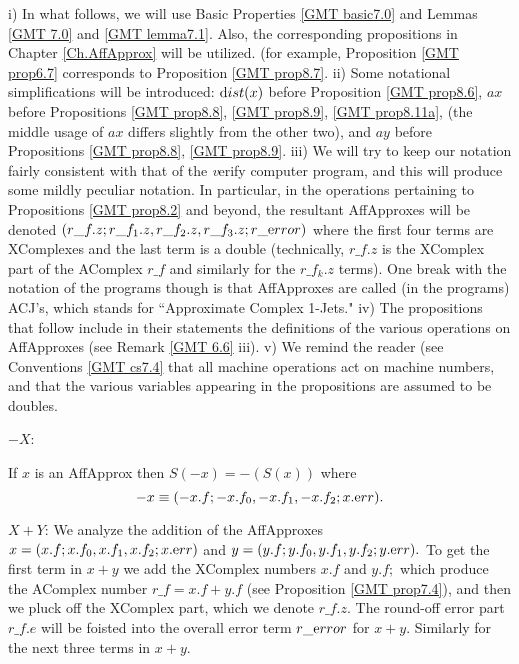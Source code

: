 \begin{conventions}\label{GMT 8.3}
i)  In what follows, we will use Basic Properties \ref{GMT basic7.0} and Lemmas \ref{GMT 7.0} and \ref{GMT lemma7.1}.  Also, the corresponding propositions in
	Chapter \ref{Ch.AffApprox}
will be utilized.
(for example, Proposition \ref{GMT prop6.7} corresponds to Proposition \ref{GMT prop8.7}.  
	ii)  Some notational simplifications will be introduced: ${\textrm dist}(x)$ before Proposition \ref{GMT prop8.6}, $ax$ before Propositions \ref{GMT prop8.8}, \ref{GMT prop8.9}, \ref{GMT prop8.11a}, 
	(the middle usage of $ax$ differs slightly from the other two), and $ay$ before Propositions \ref{GMT prop8.8}, \ref{GMT prop8.9}.
	iii)  We will try to keep our notation fairly consistent with that of the {\textit verify} computer program, and this will produce some mildly peculiar notation.  In particular, in the operations pertaining to Propositions \ref{GMT prop8.2} and beyond, the resultant AffApproxes will be denoted $(r\_f.z; r\_f_1.z, r\_f_2.z, 
r\_f_3.z; r\_{\textrm error})$
where the first four terms are XComplexes and the last term is a double (technically, $r\_f.z$ is the XComplex part of the AComplex  $r\_f$ and similarly for the $r\_f_k.z$ terms).  One break with the notation of the programs though is that AffApproxes are called (in the programs) ACJ's, which stands for ``Approximate Complex 1-Jets."
iv) The propositions that follow include in their statements the definitions of the various operations on AffApproxes (see Remark
	\ref{GMT 6.6} iii).
	v)  We remind the reader
	(see Conventions \ref{GMT cs7.4}
	that all machine operations act on machine numbers, and that the 
various variables appearing in the propositions are assumed to be doubles.
\end{conventions}

$-X$:

\begin{proposition}\label{GMT prop8.1}
If $x$ is an AffApprox 
then $S(-x) = -(S(x))$ where
$$-x \equiv (-x.f; -x.f_0,-x.f_1,-x.f_2; x.{\textrm err}).$$ \end{proposition}


$X+Y$:
We analyze the addition of the  {\textrm AffApproxes} 
 $x = (x.f; x.f_0,x.f_1, x.f_2; x.{\textrm err})$  and 
$y = (y.f; y.f_0,y.f_1,y.f_2; y.{\textrm err}).$  To get the first term in $x+y$ we add the XComplex numbers $x.f$ and $y.f;$ which
produce the AComplex number $r\_f = x.f + y.f$ (see Proposition \ref{GMT prop7.4}), and then we pluck off the XComplex part,
which we denote $r\_f.z.$  The round-off error part $r\_f.e$ will be foisted into the overall error term $r\_{\textrm error}$
for $x+y.$ Similarly for the next three terms in $x + y.$

